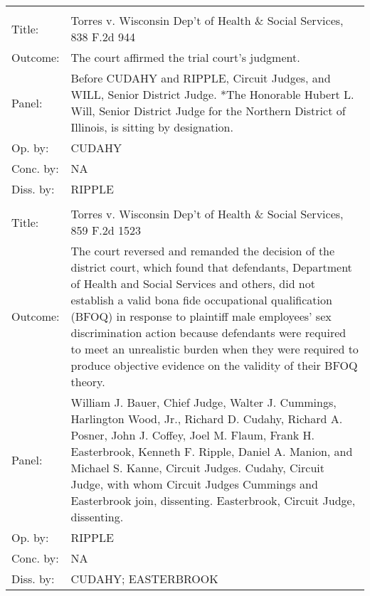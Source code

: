 \documentclass[10pt, letterpaper]{article}
\begin{document}
\begin{spacing}{1.0}
\begin{footnotesize}
\begin{longtable}[H]{lp{6in}}
        \arrayrulecolor{black}\hline\\[-4pt]
        Title: & Torres v. Wisconsin Dep't of Health \& Social Services, 838 F.2d 944\\[2pt]
        Outcome: & The court affirmed the trial court's judgment.\\[2pt]
        Panel: & Before CUDAHY and RIPPLE, Circuit Judges, and WILL, Senior District Judge. *The Honorable Hubert L. Will, Senior District Judge for the Northern District of Illinois, is sitting by designation. \\[2pt]
        Op. by: & CUDAHY \\[2pt]
        Conc. by: & NA\\[2pt]
        Diss. by: & RIPPLE \\[2pt]
        \arrayrulecolor{gray}\hline\\[-4pt]
        Title: & Torres v. Wisconsin Dep't of Health \& Social Services, 859 F.2d 1523\\[2pt]
        Outcome: & The court reversed and remanded the decision of the district court, which found that defendants, Department of Health and Social Services and others, did not establish a valid bona fide occupational qualification (BFOQ) in response to plaintiff male employees' sex discrimination action because defendants were required to meet an unrealistic burden when they were required to produce objective evidence on the validity of their BFOQ theory.\\[2pt]
        Panel: &  William J. Bauer, Chief Judge, Walter J. Cummings, Harlington Wood, Jr., Richard D. Cudahy, Richard A. Posner, John J. Coffey, Joel M. Flaum, Frank H. Easterbrook, Kenneth F. Ripple, Daniel A. Manion, and Michael S. Kanne, Circuit Judges.  Cudahy, Circuit Judge, with whom Circuit Judges Cummings and Easterbrook join, dissenting.  Easterbrook, Circuit Judge, dissenting.  \\[2pt]
        Op. by: & RIPPLE \\[2pt]
        Conc. by: & NA\\[2pt]
        Diss. by: & CUDAHY; EASTERBROOK \\[2pt]
        

\end{longtable}
\end{footnotesize}
\end{spacing}
\end{document}
